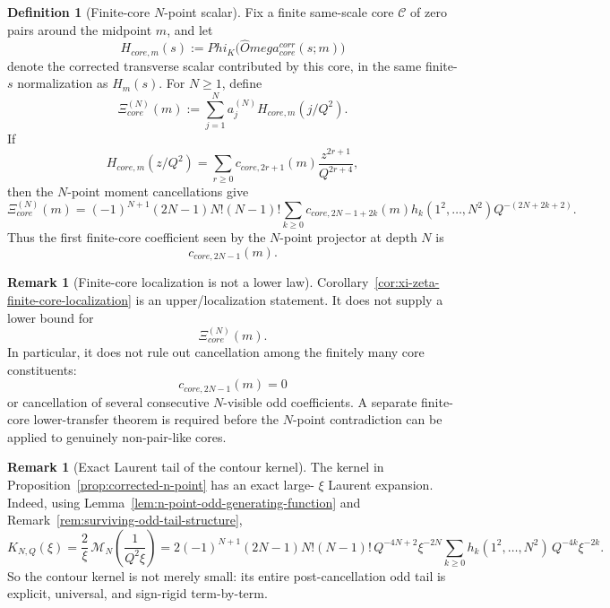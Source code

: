 \documentclass[11pt,a4paper]{amsart}
\def\Omega{Omega}%
\def\Phi{Phi}%
\def\corr{corr}%
\def\core{core}%
\theoremstyle{plain}
\theoremstyle{definition}
\newtheorem{definition}[theorem]{Definition}
\newtheorem{remark}[theorem]{Remark}
\newcommand{\corr}{\mathrm{corr}}
\newcommand{\core}{\mathrm{core}}
\begin{document}
\begin{definition}[Finite-core \(N\)-point scalar]
\label{def:finite-core-npoint-scalar}
Fix a finite same-scale core \(\mathcal C\) of zero pairs around the midpoint
\(m\), and let
\[
H_{\core,m}(s)
:=
\Phi_K\!\bigl(\widehat\Omega_{\core}^{\corr}(s;m)\bigr)
\]
denote the corrected transverse scalar contributed by this core, in the same
finite-\(s\) normalization as \(H_m(s)\).  For \(N\ge1\), define
\[
\Xi_{\core}^{(N)}(m)
:=
\sum_{j=1}^N a_j^{(N)}H_{\core,m}(j/Q^2).
\]
If
\[
H_{\core,m}(z/Q^2)
=
\sum_{r\ge 0}
c_{\core,2r+1}(m)\frac{z^{2r+1}}{Q^{2r+4}},
\]
then the \(N\)-point moment cancellations give
\[
\Xi_{\core}^{(N)}(m)
=
(-1)^{N+1}(2N-1)N!(N-1)!
\sum_{k\ge0}
c_{\core,2N-1+2k}(m)
h_k(1^2,\dots,N^2)
Q^{-(2N+2k+2)}.
\]
Thus the first finite-core coefficient seen by the \(N\)-point projector at
depth \(N\) is
\[
c_{\core,2N-1}(m).
\]
\end{definition}

\begin{remark}[Finite-core localization is not a lower law]
\label{rem:finite-core-localization-not-lower-law}
Corollary~\ref{cor:xi-zeta-finite-core-localization} is an upper/localization
statement.  It does not supply a lower bound for
\[
\Xi_{\core}^{(N)}(m).
\]
In particular, it does not rule out cancellation among the finitely many core
constituents:
\[
c_{\core,2N-1}(m)=0
\]
or cancellation of several consecutive \(N\)-visible odd coefficients.
A separate finite-core lower-transfer theorem is required before the
\(N\)-point contradiction can be applied to genuinely non-pair-like cores.
\end{remark}

\begin{remark}[Exact Laurent tail of the contour kernel]
\label{rem:n-point-kernel-laurent-tail}
The kernel in Proposition~\ref{prop:corrected-n-point} has an exact large-
$\xi$ Laurent expansion. Indeed, using
Lemma~\ref{lem:n-point-odd-generating-function} and
Remark~\ref{rem:surviving-odd-tail-structure},
\[
K_{N,Q}(\xi)
=
\frac{2}{\xi}\,
\mathcal M_N\!\left(\frac{1}{Q^2\xi}\right)
=
2(-1)^{N+1}(2N-1)N!(N-1)!\,
Q^{-4N+2}\xi^{-2N}
\sum_{k\ge 0}
h_k(1^2,\dots,N^2)\,
Q^{-4k}\xi^{-2k}.
\]
So the contour kernel is not merely small: its entire post-cancellation odd
tail is explicit, universal, and sign-rigid term-by-term.
\end{remark}
\end{document}
